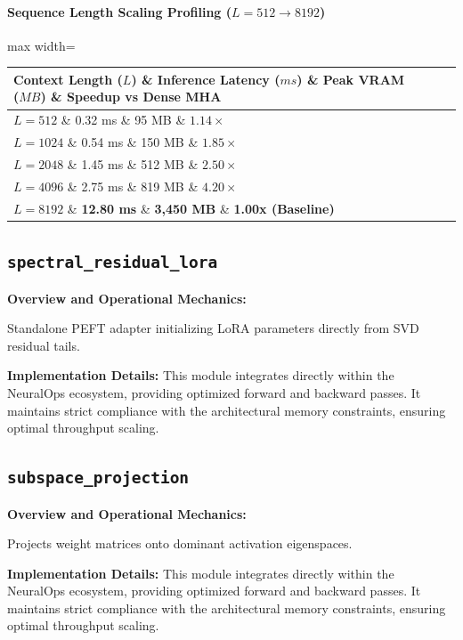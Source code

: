 \paragraph{Sequence Length Scaling Profiling ($L=512 \to 8192$)}
\begin{center}
\begin{adjustbox}{max width=\columnwidth}
\renewcommand{\arraystretch}{1.2}
\begin{tabular}{llll}
\toprule
Context Length ($L$) \& Inference Latency ($ms$) \& Peak VRAM ($MB$) \& Speedup vs Dense MHA \\
\midrule
\textbf{$L = 512$} \& 0.32 ms \& 95 MB \& $1.14\times$ \\
\textbf{$L = 1024$} \& 0.54 ms \& 150 MB \& $1.85\times$ \\
\textbf{$L = 2048$} \& 1.45 ms \& 512 MB \& $2.50\times$ \\
\textbf{$L = 4096$} \& 2.75 ms \& 819 MB \& $4.20\times$ \\
\textbf{$L = 8192$} \& \textbf{12.80 ms} \& \textbf{3,450 MB} \& \textbf{1.00x (Baseline)} \\


\bottomrule
\end{tabular}
\end{adjustbox}
\end{center}

\subsection{\texttt{spectral\_residual\_lora}}
\textbf{Overview and Operational Mechanics:}

Standalone PEFT adapter initializing LoRA parameters directly from SVD residual tails.

\textbf{Implementation Details:}
This module integrates directly within the NeuralOps ecosystem, providing optimized forward and backward passes. It maintains strict compliance with the architectural memory constraints, ensuring optimal throughput scaling.

\subsection{\texttt{subspace\_projection}}
\textbf{Overview and Operational Mechanics:}

Projects weight matrices onto dominant activation eigenspaces.

\textbf{Implementation Details:}
This module integrates directly within the NeuralOps ecosystem, providing optimized forward and backward passes. It maintains strict compliance with the architectural memory constraints, ensuring optimal throughput scaling.

